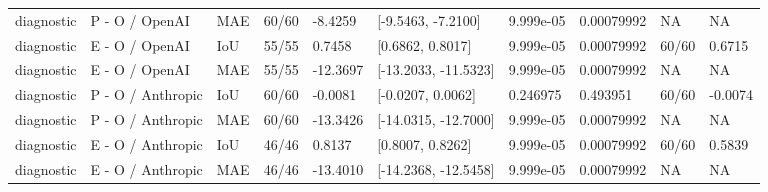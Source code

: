 \begin{table}[t]
{\begin{tabular}{llllllllll}
diagnostic & P - O / OpenAI & MAE & 60/60 & -8.4259 & [-9.5463, -7.2100] & 9.999e-05 & 0.00079992 & NA & NA \\
diagnostic & E - O / OpenAI & IoU & 55/55 & 0.7458 & [0.6862, 0.8017] & 9.999e-05 & 0.00079992 & 60/60 & 0.6715 \\
diagnostic & E - O / OpenAI & MAE & 55/55 & -12.3697 & [-13.2033, -11.5323] & 9.999e-05 & 0.00079992 & NA & NA \\
diagnostic & P - O / Anthropic & IoU & 60/60 & -0.0081 & [-0.0207, 0.0062] & 0.246975 & 0.493951 & 60/60 & -0.0074 \\
diagnostic & P - O / Anthropic & MAE & 60/60 & -13.3426 & [-14.0315, -12.7000] & 9.999e-05 & 0.00079992 & NA & NA \\
diagnostic & E - O / Anthropic & IoU & 46/46 & 0.8137 & [0.8007, 0.8262] & 9.999e-05 & 0.00079992 & 60/60 & 0.5839 \\
diagnostic & E - O / Anthropic & MAE & 46/46 & -13.4010 & [-14.2368, -12.5458] & 9.999e-05 & 0.00079992 & NA & NA \\
\bottomrule
\end{tabular}}
\end{table}
